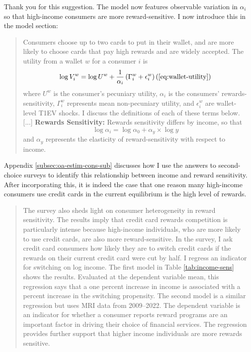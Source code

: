 \documentclass[main.tex]{subfiles}
\begin{document}
\begin{refsection}
Thank you for this suggestion.
The model now features observable variation in $\alpha_i$ so that high-income consumers are more reward-sensitive.
I now introduce this in the model section:
\begin{quotation}
    Consumers choose up to two cards to put in their wallet, and are more likely to choose cards that pay high rewards and are widely accepted.
The utility from a wallet $w$ for a consumer $i$ is
\begin{equation}
  \log V_{i}^{w}=\log U^w +\frac{1}{\alpha_{i}}\left(\Gamma_{i}^{w}+\epsilon_{i}^{w}\right) (\ref{eq:wallet-utility}) \nonumber
\end{equation}
where $U^w$ is the consumer's pecuniary utility, $\alpha_i$ is the consumers' rewards-sensitivity, $\Gamma_i^w$ represents mean non-pecuniary utility, and $\epsilon_i^w$ are wallet-level T1EV shocks.
I discuss the definitions of each of these terms below.
    [...]
    \noindent \textbf{Rewards Sensitivity:}\hspace{0.2in} Rewards sensitivity differs by income, so that
\[
  \log \alpha_i = \log \alpha_0 + \alpha_y \times \log y
\]
and $\alpha_y$ represents the elasticity of reward-sensitivity with respect to income.
\end{quotation}

Appendix \ref{subsec:oa-estim-cons-sub} discusses how I use the answers to second-choice surveys to identify this relationship between income and reward sensitivity.
After incorporating this, it is indeed the case that one reason many high-income consumers use credit cards in the current equilibrium is the high level of rewards.

\begin{quotation}
    The survey also sheds light on consumer heterogeneity in reward sensitivity.
The results imply that credit card rewards competition is particularly intense because high-income individuals, who are more likely to use credit cards, are also more reward-sensitive.
In the survey, I ask credit card consumers how likely they are to switch credit cards if the rewards on their current credit card were cut by half.
I regress an indicator for switching on log income.
The first model in Table \ref{tab:income-sens} shows the results.
Evaluated at the dependent variable mean, this regression says that a one percent increase in income is associated with a  percent increase in the switching propensity.
The second model is a similar regression but uses MRI data from 2009--2022.
The dependent variable is an indicator for whether a consumer reports reward programs are an important factor in driving their choice of financial services.
The regression provides further support that higher income individuals are more rewards sensitive.


\end{quotation}
\end{refsection}
\end{document}
